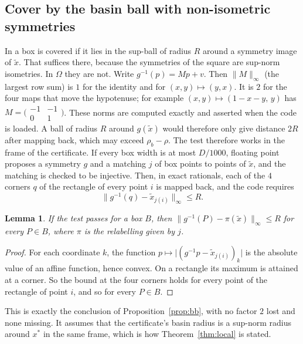 \documentclass[11pt]{amsart}
\newtheorem{lemma}[theorem]{Lemma}
\theoremstyle{definition}
\newcommand{\Om}{\Omega}
\begin{document}
\subsection{Cover by the basin ball with non-isometric symmetries}\label{sec:cover}
In \cite{N9} a box is covered if it lies in the sup-ball of radius $R$ around a symmetry image of $\tilde x$. That suffices there, because the symmetries of the square are sup-norm isometries. In $\Om$ they are not. Write $g^{-1}(p) = Mp + v$. Then $\|M\|_\infty$ (the largest row sum) is $1$ for the identity and for $(x,y)\mapsto(y,x)$. It is $2$ for the four maps that move the hypotenuse; for example $(x,y)\mapsto(1-x-y,\,y)$ has $M = \bigl(\begin{smallmatrix}-1&-1\\0&1\end{smallmatrix}\bigr)$. These norms are computed exactly and asserted when the code is loaded. A ball of radius $R$ around $g(\tilde x)$ would therefore only give distance $2R$ after mapping back, which may exceed $\rho_b - \rho$. %
The test therefore works in the frame of the certificate. If every box width is at most $D/1000$, floating point proposes a symmetry $g$ and a matching $j$ of box points to points of $\tilde x$, and the matching is checked to be injective. Then, in exact rationals, each of the $4$ corners $q$ of the rectangle of every point $i$ is mapped back, and the code requires
\[
 \|g^{-1}(q) - \tilde x_{j(i)}\|_\infty \le R .
\]
\begin{lemma}\label{lem:cover}
If the test passes for a box $B$, then $\|g^{-1}(P) - \pi(\tilde x)\|_\infty \le R$ for every $P \in B$, where $\pi$ is the relabelling given by $j$.
\end{lemma}
\begin{proof}
For each coordinate $k$, the function $p \mapsto \lvert(g^{-1}p - \tilde x_{j(i)})_k\rvert$ is the absolute value of an affine function, hence convex. On a rectangle its maximum is attained at a corner. So the bound at the four corners holds for every point of the rectangle of point $i$, and so for every $P \in B$.
\end{proof}
This is exactly the conclusion of Proposition~\ref{prop:bb}, with no factor $2$ lost and none missing. It assumes that the certificate's basin radius is a sup-norm radius around $x^*$ in the same frame, which is how Theorem~\ref{thm:local} is stated.
\end{document}
